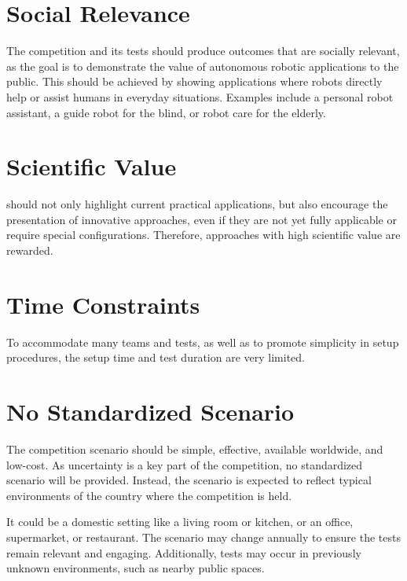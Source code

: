 \section{Social Relevance}\label{concept:social_relevance}

The competition and its tests should produce outcomes that are socially relevant, as the goal is to demonstrate the value of autonomous robotic applications to the public.
This should be achieved by showing applications where robots directly help or assist humans in everyday situations.
Examples include a personal robot assistant, a guide robot for the blind, or robot care for the elderly.

\section{Scientific Value}\label{concept:scientific_value}

\AtHome{} should not only highlight current practical applications, but also encourage the presentation of innovative approaches, even if they are not yet fully applicable or require special configurations.
Therefore, approaches with high scientific value are rewarded.

\section{Time Constraints}\label{concept:time_constraints}

To accommodate many teams and tests, as well as to promote simplicity in setup procedures, the setup time and test duration are very limited.

\section{No Standardized Scenario}\label{concept:no_standardized_scenario}

The competition scenario should be simple, effective, available worldwide, and low-cost.
As uncertainty is a key part of the competition, no standardized scenario will be provided.
Instead, the scenario is expected to reflect typical environments of the country where the competition is held.

It could be a domestic setting like a living room or kitchen, or an office, supermarket, or restaurant. The scenario may change annually to ensure the tests remain relevant and engaging. Additionally, tests may occur in previously unknown environments, such as nearby public spaces.

